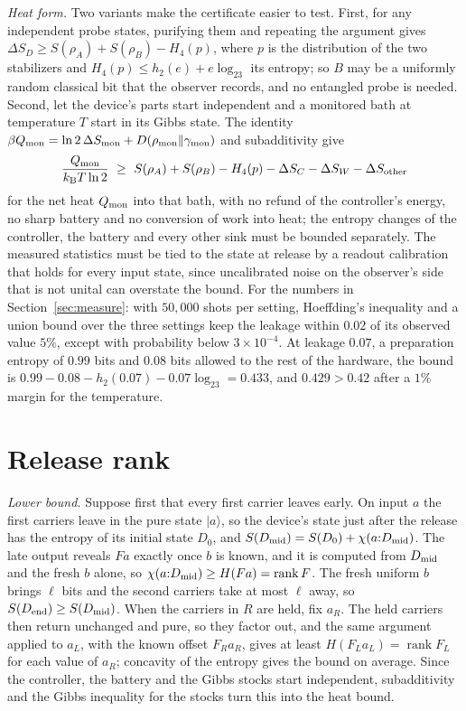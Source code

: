 \documentclass[11pt]{article}
\theoremstyle{definition}
\theoremstyle{remark}
\newcommand{\kB}{k_{\mathrm B}}
\begin{document}
\emph{Heat form.} Two variants make the certificate easier to test. First, for any independent probe states, purifying them and repeating the argument gives $\Delta S_D\ge S(\rho_A)+S(\rho_B)-H_4(p)$, where $p$ is the distribution of the two stabilizers and $H_4(p)\le h_2(e)+e\log_23$ its entropy; so $B$ may be a uniformly random classical bit that the observer records, and no entangled probe is needed. Second, let the device's parts start independent and a monitored bath at temperature $T$ start in its Gibbs state. The identity $\beta Q_{\rm mon}=\ln2\,\Delta S_{\rm mon}+D(\rho_{\rm mon}\|\gamma_{\rm mon})$ and subadditivity give
\[
\frac{Q_{\rm mon}}{\kB T\ln2}\ \ge\ S(\rho_A)+S(\rho_B)-H_4(p)-\Delta S_C-\Delta S_W-\Delta S_{\rm other}
\]
for the net heat $Q_{\rm mon}$ into that bath, with no refund of the controller's energy, no sharp battery and no conversion of work into heat; the entropy changes of the controller, the battery and every other sink must be bounded separately. The measured statistics must be tied to the state at release by a readout calibration that holds for every input state, since uncalibrated noise on the observer's side that is not unital can overstate the bound. For the numbers in Section~\ref{sec:measure}: with $50{,}000$ shots per setting, Hoeffding's inequality and a union bound over the three settings keep the leakage within $0.02$ of its observed value $5\%$, except with probability below $3\times10^{-4}$. At leakage $0.07$, a preparation entropy of $0.99$ bits and $0.08$ bits allowed to the rest of the hardware, the bound is $0.99-0.08-h_2(0.07)-0.07\log_23=0.433$, and $0.429>0.42$ after a $1\%$ margin for the temperature.

\section{Release rank}\label{app:rank}

\emph{Lower bound.} Suppose first that every first carrier leaves early. On input $a$ the first carriers leave in the pure state $|a\rangle$, so the device's state just after the release has the entropy of its initial state $D_0$, and $S(D_{\rm mid})=S(D_0)+\chi(a{:}D_{\rm mid})$. The late output reveals $Fa$ exactly once $b$ is known, and it is computed from $D_{\rm mid}$ and the fresh $b$ alone, so $\chi(a{:}D_{\rm mid})\ge H(Fa)=\operatorname{rank}F$. The fresh uniform $b$ brings $\ell$ bits and the second carriers take at most $\ell$ away, so $S(D_{\rm end})\ge S(D_{\rm mid})$. When the carriers in $R$ are held, fix $a_R$. The held carriers then return unchanged and pure, so they factor out, and the same argument applied to $a_L$, with the known offset $F_Ra_R$, gives at least $H(F_La_L)=\operatorname{rank}F_L$ for each value of $a_R$; concavity of the entropy gives the bound on average. Since the controller, the battery and the Gibbs stocks start independent, subadditivity and the Gibbs inequality for the stocks turn this into the heat bound.
\end{document}
